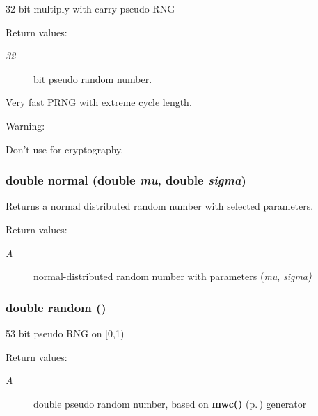 32 bit multiply with carry pseudo RNG

\begin{Desc}
\item[Return values: ]\par
\begin{description}
\item[{\em 
32}]bit pseudo random number.\end{description}
\end{Desc}
Very fast PRNG with extreme cycle length. \begin{Desc}
\item[Warning: ]\par
Don't use for cryptography. \end{Desc}
\subsubsection{\setlength{\rightskip}{0pt plus 5cm}double normal (double {\em mu}, double {\em sigma})}\label{hpmath_8h_a50}


Returns a normal distributed random number with selected parameters.

\begin{Desc}
\item[Return values: ]\par
\begin{description}
\item[{\em 
A}]normal-distributed random number with parameters ({\em mu}, {\em sigma)} \end{description}
\end{Desc}
\subsubsection{\setlength{\rightskip}{0pt plus 5cm}double random ()}\label{hpmath_8h_a48}


53 bit pseudo RNG on [0,1)

\begin{Desc}
\item[Return values: ]\par
\begin{description}
\item[{\em 
A}]double pseudo random number, based on {\bf mwc()} {\rm (p.\,\pageref{hpmath_8h_a47})} generator \end{description}
\end{Desc}
